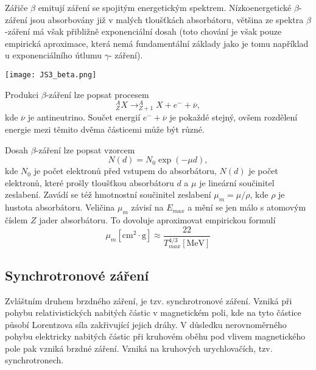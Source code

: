 \documentclass[../../main.tex]{subfiles}
\begin{document}
Zářiče $\beta$ emitují záření se spojitým energetickým spektrem. Nízkoenergetické $\beta$-záření jsou absorbovány již v malých tloušťkách absorbátoru, většina ze spektra $\beta$-záření má však přibližně exponenciální dosah (toto chování je však pouze empirická aproximace, která nemá fundamentální základy jako je tomu například u exponenciálního útlumu $\gamma$- záření).

\begin{center}
	\texttt{[image: JS3\_beta.png]}
\end{center}

Produkci $\beta$-záření lze popsat procesem
\begin{equation}
^{A}_{Z}X \rightarrow ^{A}_{Z+1}X + e^- + \overline{\nu},
\end{equation}
kde $\overline{\nu}$ je antineutrino. Součet energií $e^- + \overline{\nu}$ je pokaždé stejný, ovšem rozdělení energie mezi těmito dvěma částicemi může být různé.

Dosah $\beta$-záření lze popsat vzorcem
\begin{equation}
N(d) = N_0 \exp (- \mu d),
\end{equation}
kde $N_0$ je počet elektronů před vstupem do absorbátoru, $N(d)$ je počet elektronů, které prošly tloušťkou absorbátoru $d$ a $\mu$ je lineární součinitel zeslabení. Zavádí se též hmotnostní součinitel zeslabení $\mu_m = \mu /\rho $, kde $\rho$ je hustota absorbátoru. Veličina $\mu_m$ závisí na $E_{max}$ a mění se jen málo s atomovým číslem $Z$ jader absorbátoru. To dovoluje aproximovat empirickou formulí
\begin{equation}
\mu _m [\mathrm{cm^2 \cdotp g}] \approx \dfrac{22}{T_{max}^{4/3} [\mathrm{MeV}]}
\end{equation}

\subsection{Synchrotronové záření}

Zvláštním druhem brzdného záření, je tzv. synchrotronové záření. Vzniká při pohybu relativistických nabitých částic v magnetickém poli, kde na tyto částice působí Lorentzova síla zakřivující jejich dráhy. V důsledku nerovnoměrného pohybu elektricky nabitých částic při kruhovém oběhu pod vlivem magnetického pole pak vzniká brzdné záření. Vzniká na kruhových urychlovačích, tzv. synchrotronech. 
\end{document}
